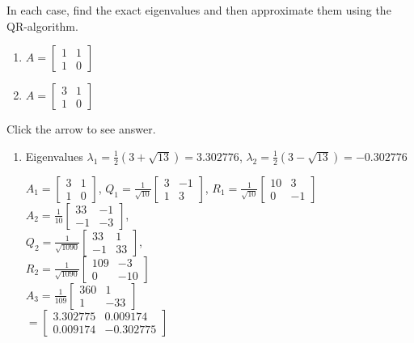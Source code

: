 \documentclass{ximera}
\begin{document}
\begin{problem}\label{prob:eigenQRapprox}
In each case, find the exact eigenvalues and then approximate them using the QR-algorithm.


\begin{enumerate}
\item $A = \left[ \begin{array}{rr}
1 & 1 \\
1 & 0
\end{array}\right]$
\item $A = \left[ \begin{array}{rr}
3 & 1 \\
1 & 0
\end{array}\right]$
\end{enumerate}

Click the arrow to see answer.
\begin{expandable}{}{}
\begin{enumerate} 
\item  Eigenvalues $\lambda_{1} = \frac{1}{2}(3 + \sqrt{13}) = 3.302776$, $\lambda_{2} = \frac{1}{2}(3 - \sqrt{13}) = -0.302776$

$A_{1} = \left[ \begin{array}{rr}
3 & 1 \\
1 & 0
\end{array}\right]$, $Q_{1} = \frac{1}{\sqrt{10}}\left[ \begin{array}{rr}
3 & -1 \\
1 & 3
\end{array}\right]$, $R_{1} = \frac{1}{\sqrt{10}}\left[ \begin{array}{rr}
10 & 3 \\
0 & -1
\end{array}\right]$ \\
$A_{2} = \frac{1}{10}\left[ \begin{array}{rr}
33 & -1 \\
-1 & -3
\end{array}\right]$, \\ $Q_{2} = \frac{1}{\sqrt{1090}}\left[ \begin{array}{rr}
33 & 1 \\
-1 & 33
\end{array}\right]$, \\ $R_{2} = \frac{1}{\sqrt{1090}}\left[ \begin{array}{rr}
109 & -3 \\
0 & -10
\end{array}\right]$ \\
$A_{3} = \frac{1}{109}\left[ \begin{array}{rr}
360 & 1 \\
1 & -33
\end{array}\right]$ \\ ${} = \left[ \begin{array}{rr}
3.302775 & 0.009174 \\
0.009174 & -0.302775
\end{array}\right]$

\end{enumerate}
\end{expandable}
\end{problem}
\end{document}
